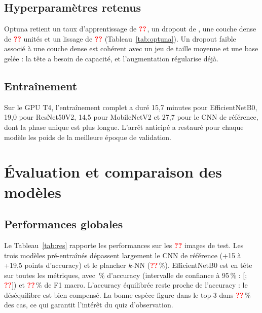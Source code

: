 \documentclass[conference]{IEEEtran}
\newcommand{\todo}{\textcolor{red}{\textbf{??}}}
\newcommand{\nTest}{\todo}\newcommand{\knnBaseline}{\todo}\newcommand{\bestModel}{\todo}
\newcommand{\bestCiHigh}{\todo}\newcommand{\bestF}{\todo}\newcommand{\bestTop}{\todo}
\newcommand{\hpDense}{\todo}\newcommand{\hpSmooth}{\todo}\newcommand{\resultsRows}{}
\begin{document}
\subsection{Hyperparamètres retenus}
Optuna retient un taux d'apprentissage de $\hpLr$, un dropout de \hpDropout{}, une couche dense de \hpDense{} unités et un lissage de \hpSmooth{} (Tableau~\ref{tab:optuna}). Un dropout faible associé à une couche dense est cohérent avec un jeu de taille moyenne et une base gelée : la tête a besoin de capacité, et l'augmentation régularise déjà.

\subsection{Entraînement}
Sur le GPU T4, l'entraînement complet a duré 15,7 minutes pour EfficientNetB0, 19,0 pour ResNet50V2, 14,5 pour MobileNetV2 et 27,7 pour le CNN de référence, dont la phase unique est plus longue. L'arrêt anticipé a restauré pour chaque modèle les poids de la meilleure époque de validation.

\section{Évaluation et comparaison des modèles}\label{sec:eval}
\subsection{Performances globales}
Le Tableau~\ref{tab:res} rapporte les performances sur les \nTest{} images de test. Les trois modèles pré-entraînés dépassent largement le CNN de référence (+15 à +19,5 points d'accuracy) et le plancher $k$-NN (\knnBaseline\,\%). EfficientNetB0 est en tête sur toutes les métriques, avec \bestAcc\,\% d'accuracy (intervalle de confiance à 95\,\% : [\bestCiLow ; \bestCiHigh]) et \bestF\,\% de F1 macro. L'accuracy équilibrée reste proche de l'accuracy : le déséquilibre est bien compensé. La bonne espèce figure dans le top-3 dans \bestTop\,\% des cas, ce qui garantit l'intérêt du quiz d'observation.
\end{document}
